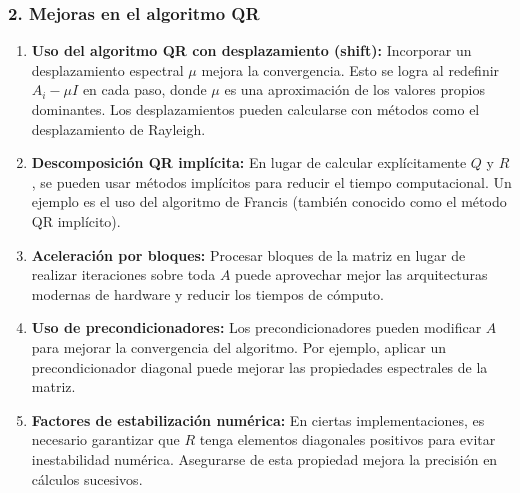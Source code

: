 \subsubsection{2. Mejoras en el algoritmo QR}
\begin{enumerate}
    \item \textbf{Uso del algoritmo QR con desplazamiento (shift):}
    Incorporar un desplazamiento espectral \( \mu \) mejora la convergencia. Esto se logra al redefinir \( A_i - \mu I \) en cada paso, donde \( \mu \) es una aproximación de los valores propios dominantes. Los desplazamientos pueden calcularse con métodos como el desplazamiento de Rayleigh.

    \item \textbf{Descomposición QR implícita:}
    En lugar de calcular explícitamente \( Q \) y \( R \), se pueden usar métodos implícitos para reducir el tiempo computacional. Un ejemplo es el uso del algoritmo de Francis (también conocido como el método QR implícito).

    \item \textbf{Aceleración por bloques:}
    Procesar bloques de la matriz en lugar de realizar iteraciones sobre toda \( A \) puede aprovechar mejor las arquitecturas modernas de hardware y reducir los tiempos de cómputo.

    \item \textbf{Uso de precondicionadores:}
    Los precondicionadores pueden modificar \( A \) para mejorar la convergencia del algoritmo. Por ejemplo, aplicar un precondicionador diagonal puede mejorar las propiedades espectrales de la matriz.

    \item \textbf{Factores de estabilización numérica:}
    En ciertas implementaciones, es necesario garantizar que \( R \) tenga elementos diagonales positivos para evitar inestabilidad numérica. Asegurarse de esta propiedad mejora la precisión en cálculos sucesivos.

\end{enumerate}